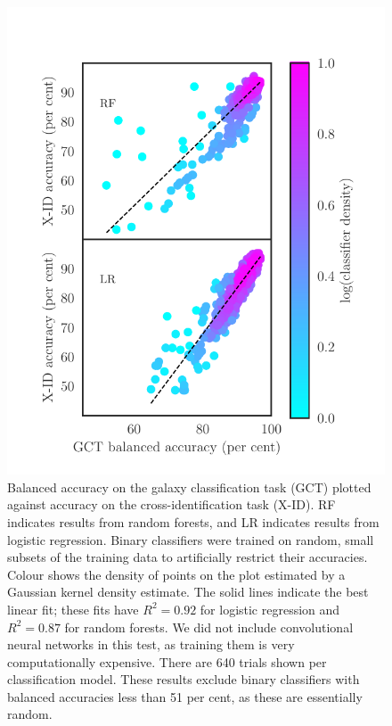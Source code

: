\documentclass[fleqn,usenatbib,usedcolumn]{mnras}
\begin{document}
    \begin{figure}
      \centering
      \includegraphics[width=\columnwidth]{images/gct-to-xid.pdf}
      \caption{Balanced accuracy on the galaxy classification task (GCT) plotted
      against accuracy on the cross-identification task (X-ID). RF indicates
      results from random forests, and LR indicates results from logistic
      regression. Binary classifiers were trained on random, small subsets of the
      training data to artificially restrict their accuracies. Colour shows
      the density of points on the plot estimated by a Gaussian kernel density
      estimate. The solid lines indicate the best linear fit; these fits have
      $R^2 = 0.92$ for logistic regression and $R^2 = 0.87$ for random
      forests. We did not include convolutional neural networks in this test,
      as training them is very computationally expensive. There are 640 trials shown per classification model. These results
      exclude binary classifiers with balanced accuracies less than 51 per cent, as
      these are essentially random.
      \label{fig:gct-to-xid}}
    \end{figure}
\end{document}
